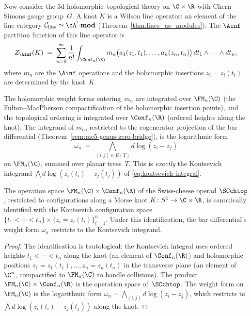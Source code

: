Now consider the 3d holomorphic--topological theory on
$\C \times \R$ with Chern--Simons gauge group~$G$. A knot
$K$ is a Wilson line operator: an element of the line category
$\mathcal{C}_{\mathrm{line}} \simeq \cA^!\text{-}\mathbf{mod}$
(Theorem~\ref{thm:lines_as_modules}). The $\Ainf$ partition
function of this line operator is
\begin{equation}
Z_{\Ainf}(K) \;=\; \sum_{n=0}^{\infty} \frac{1}{n!}
\int_{\Conf_n(\R)}
m_n\bigl(a_1(z_1,t_1), \ldots, a_n(z_n,t_n)\bigr)\,
dt_1 \wedge \cdots \wedge dt_n,
\end{equation}
where $m_n$ are the $\Ainf$ operations and the holomorphic
insertions $z_i = z_i(t_i)$ are determined by the knot~$K$.

The holomorphic weight forms entering~$m_n$
are integrated over $\FM_n(\C)$ (the Fulton--MacPherson
compactification of the holomorphic insertion points), and the
topological ordering is integrated over $\Conf_n(\R)$ (ordered
heights along the knot). The integrand of $m_n$, restricted to
the cogenerator projection of the bar differential
(Theorem~\ref{rem:mc5-genus-zero-bridge}), is the logarithmic
form
\[
\omega_n \;=\; \bigwedge_{(i,j) \in E(T)} d\log(z_i - z_j)
\]
on $\FM_n(\C)$, summed over planar trees~$T$. This is
\emph{exactly} the Kontsevich integrand
$\bigwedge d\log(z_i(t_i) - z_j(t_j))$ of
\eqref{eq:kontsevich-integral}.

\begin{proposition}
The operation space $\FM_n(\C) \times \Conf_n(\R)$ of the
Swiss-cheese operad $\SCchtop$, restricted to configurations
along a Morse knot $K \colon S^1 \to \C \times \R$, is
canonically identified with the Kontsevich configuration space
$\{t_1 < \cdots < t_n\} \times \{z_i = z_i(t_i)\}_{i=1}^n$.
Under this identification, the bar differential's weight form
$\omega_n$ restricts to the Kontsevich integrand.
\end{proposition}

\begin{proof}
The identification is tautological: the Kontsevich
integral uses ordered heights $t_1 < \cdots < t_n$ along the
knot (an element of $\Conf_n(\R)$) and holomorphic positions
$z_1 = z_1(t_1), \ldots, z_n = z_n(t_n)$ in the transverse
plane (an element of $\C^n$, compactified to $\FM_n(\C)$ to
handle collisions). The product
$\FM_n(\C) \times \Conf_n(\R)$ is the operation space
of~$\SCchtop$. The weight form on $\FM_n(\C)$ is the
logarithmic form $\omega_n = \bigwedge_{(i,j)} d\log(z_i - z_j)$,
which restricts to $\bigwedge d\log(z_i(t_i) - z_j(t_j))$ along
the knot.
\end{proof}

